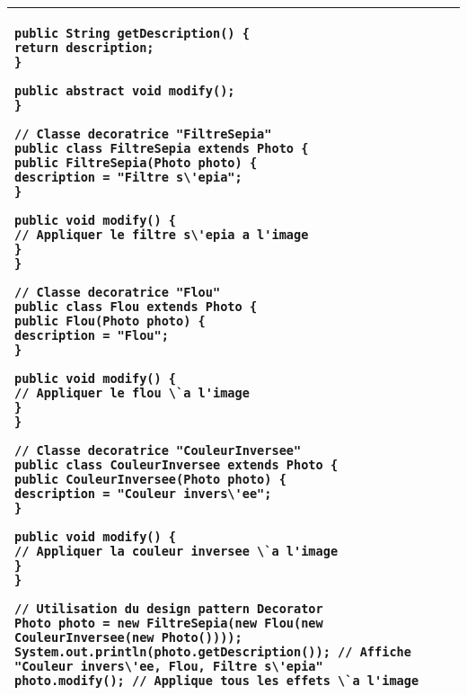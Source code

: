 \begin{table}[H]
\begin{adjustbox}{max width=\textwidth}
\begin{tabular}{l|p{\textwidth}}
\begin{minipage}[tr]{0.5\textwidth}
\begin{minipage}[b]{1\textwidth}
\begin{lstlisting}[style=monstyle]
public String getDescription() {
return description;
}

public abstract void modify();
}

// Classe decoratrice "FiltreSepia"
public class FiltreSepia extends Photo {
public FiltreSepia(Photo photo) {
description = "Filtre s\'epia";
}

public void modify() {
// Appliquer le filtre s\'epia a l'image
}
}

// Classe decoratrice "Flou"
public class Flou extends Photo {
public Flou(Photo photo) {
description = "Flou";
}

public void modify() {
// Appliquer le flou \`a l'image
}
}

// Classe decoratrice "CouleurInversee"
public class CouleurInversee extends Photo {
public CouleurInversee(Photo photo) {
description = "Couleur invers\'ee";
}

public void modify() {
// Appliquer la couleur inversee \`a l'image
}
}

// Utilisation du design pattern Decorator
Photo photo = new FiltreSepia(new Flou(new CouleurInversee(new Photo())));
System.out.println(photo.getDescription()); // Affiche "Couleur invers\'ee, Flou, Filtre s\'epia"
photo.modify(); // Applique tous les effets \`a l'image
\end{lstlisting}
\end{minipage}

\end{minipage}
\\
\bottomrule
\end{tabular}
\end{adjustbox}
\end{table}